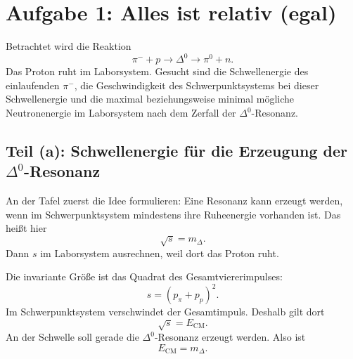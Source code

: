 \documentclass[11pt,a4paper]{scrartcl}
\newcommand{\pionm}{\pi^-}
\newcommand{\pionz}{\pi^0}
\newcommand{\Dzero}{\Delta^0}
\theoremstyle{definition}
\theoremstyle{plain}
\theoremstyle{remark}
\begin{document}
\newpage

\section{Aufgabe 1: Alles ist relativ (egal)}

\begin{taskbox}
Betrachtet wird die Reaktion
\[
    \pionm + p \longrightarrow \Dzero \longrightarrow \pionz + n.
\]
Das Proton ruht im Laborsystem. Gesucht sind die Schwellenergie des einlaufenden $\pionm$, die Geschwindigkeit des Schwerpunktsystems bei dieser Schwellenergie und die maximal beziehungsweise minimal m\"ogliche Neutronenergie im Laborsystem nach dem Zerfall der $\Dzero$-Resonanz.
\end{taskbox}

\subsection{Teil (a): Schwellenergie f\"ur die Erzeugung der $\Dzero$-Resonanz}

\begin{presentationbox}
An der Tafel zuerst die Idee formulieren: Eine Resonanz kann erzeugt werden, wenn im Schwerpunktsystem mindestens ihre Ruheenergie vorhanden ist. Das hei\ss t hier
\[
    \sqrt{s}=m_\Delta.
\]
Dann $s$ im Laborsystem ausrechnen, weil dort das Proton ruht.
\end{presentationbox}

\begin{calculationbox}[title=Invariante Masse und Schwerpunktsenergie]
Die invariante Gr\"o\ss e ist das Quadrat des Gesamtviererimpulses:
\[
    s=(p_\pi+p_p)^2.
\]
Im Schwerpunktsystem verschwindet der Gesamtimpuls. Deshalb gilt dort
\[
    \sqrt{s}=E_{\mathrm{CM}}.
\]
An der Schwelle soll gerade die $\Dzero$-Resonanz erzeugt werden. Also ist
\[
    E_{\mathrm{CM}}=m_\Delta.
\]
\end{calculationbox}
\end{document}
